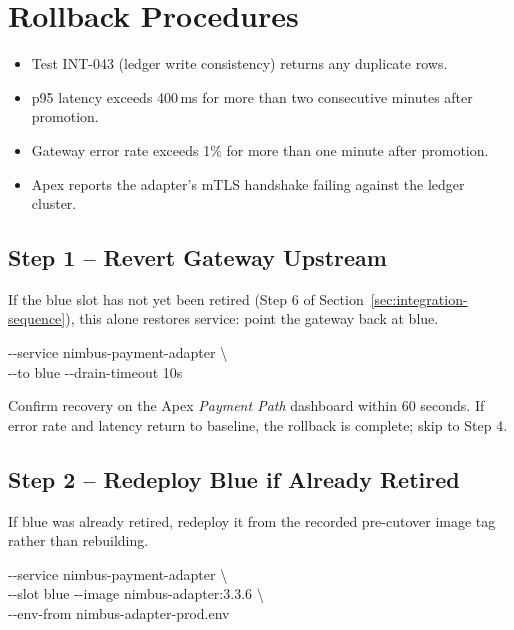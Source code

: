 \section{Rollback Procedures}
\label{sec:rollback}

\begin{warnbox}
\begin{itemize}
  \item Test INT-043 (ledger write consistency) returns any duplicate rows.
  \item p95 latency exceeds 400\,ms for more than two consecutive minutes after promotion.
  \item Gateway error rate exceeds 1\% for more than one minute after promotion.
  \item Apex reports the adapter's mTLS handshake failing against the ledger cluster.
\end{itemize}
\end{warnbox}

\subsection{Step 1 -- Revert Gateway Upstream}
If the blue slot has not yet been retired (Step 6 of Section~\ref{sec:integration-sequence}),
this alone restores service: point the gateway back at blue.

\begin{cmdbox}
\hspace*{1.4em}-{}-service nimbus-payment-adapter \textbackslash\\
\hspace*{1.4em}-{}-to blue -{}-drain-timeout 10s
\end{cmdbox}

Confirm recovery on the Apex \emph{Payment Path} dashboard within 60 seconds. If error rate and
latency return to baseline, the rollback is complete; skip to Step 4.

\subsection{Step 2 -- Redeploy Blue if Already Retired}
If blue was already retired, redeploy it from the recorded pre-cutover image tag rather than
rebuilding.

\begin{cmdbox}
\hspace*{1.4em}-{}-service nimbus-payment-adapter \textbackslash\\
\hspace*{1.4em}-{}-slot blue -{}-image nimbus-adapter:3.3.6 \textbackslash\\
\hspace*{1.4em}-{}-env-from nimbus-adapter-prod.env
\end{cmdbox}

